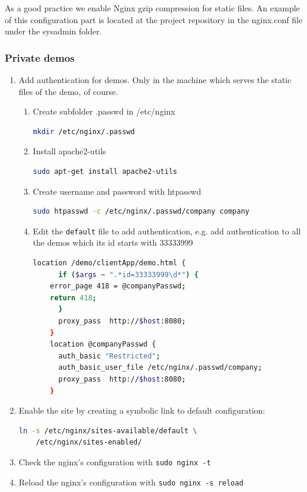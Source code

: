 \documentclass[a4paper,12pt]{article}
\begin{document}
As a good practice we enable Nginx gzip compression for static files. An example of this configuration part is located at the project repository 
in the nginx.conf file under the sysadmin folder.

\subsubsection{Private demos}
\begin{enumerate}
    \item Add authentication for demos. Only in the machine which serves the static files of the demo, of course.
    \begin{enumerate}
    \item Create subfolder .passwd in /etc/nginx
    \begin{lstlisting}[language=Bash]
    mkdir /etc/nginx/.passwd
    \end{lstlisting}
    \item Install apache2-utils
    \begin{lstlisting}[language=Bash]
    sudo apt-get install apache2-utils
    \end{lstlisting}
    \item Create username and password with htpasswd
    \begin{lstlisting}[language=Bash]
     sudo htpasswd -c /etc/nginx/.passwd/company company
    \end{lstlisting}
    \item Edit the {\tt default} file to add authentication, e.g. add authentication to all the demos which its id starts with 33333999
    \begin{lstlisting}[language=Bash]
    location /demo/clientApp/demo.html {
      if ($args ~ ".*id=33333999\d*") {
	error_page 418 = @companyPasswd;
	return 418;
      }
      proxy_pass  http://$host:8080;
    }
    location @companyPasswd {
      auth_basic "Restricted";
      auth_basic_user_file /etc/nginx/.passwd/company;
      proxy_pass  http://$host:8080;
    }
    \end{lstlisting}
    \end{enumerate}

    \item Enable the site by creating a symbolic link to default configuration:
    \begin{lstlisting}[language=Bash]
    ln -s /etc/nginx/sites-available/default \
    /etc/nginx/sites-enabled/
    \end{lstlisting}

    \item Check the nginx's configuration with {\tt sudo nginx -t}

    \item Reload the nginx's configuration with {\tt sudo nginx -s reload}
\end{enumerate}
\end{document}
